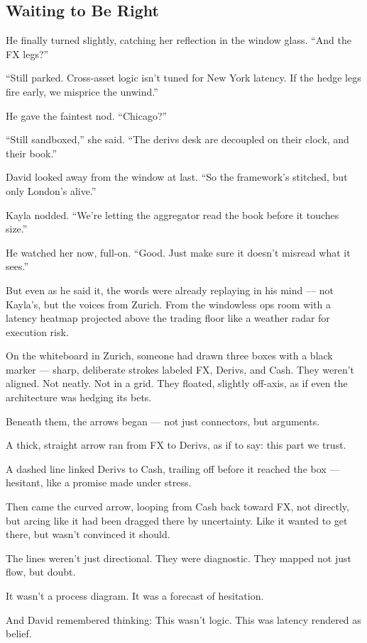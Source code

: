 
\subsection{Waiting to Be Right}

He finally turned slightly, catching her reflection in the window glass.
“And the FX legs?”

“Still parked. Cross-asset logic isn’t tuned for New York latency. If the hedge legs fire early, we misprice the unwind.”

He gave the faintest nod.
“Chicago?”

“Still sandboxed,” she said. “The derivs desk are decoupled on their clock, and their book.”

David looked away from the window at last.
“So the framework’s stitched, but only London’s alive.”

Kayla nodded.
“We’re letting the aggregator read the book before it touches size.”

He watched her now, full-on.
“Good. Just make sure it doesn’t misread what it sees.”

But even as he said it, the words were already replaying in his mind —
not Kayla’s, but the voices from Zurich.
From the windowless ops room with a latency heatmap projected above the trading floor like a weather 
radar for execution risk.

On the whiteboard in Zurich, someone had drawn three boxes with a black marker — sharp, deliberate strokes labeled FX, Derivs, 
and Cash. They weren’t aligned. Not neatly. Not in a grid.
They floated, slightly off-axis, as if even the architecture was hedging its bets.

Beneath them, the arrows began — not just connectors, but arguments.

A thick, straight arrow ran from FX to Derivs, as if to say: this part we trust.

A dashed line linked Derivs to Cash, trailing off before it reached the box — hesitant, like a promise made under stress.

Then came the curved arrow, looping from Cash back toward FX, not directly, but arcing like it had been dragged there by uncertainty. Like it wanted to get there, but wasn’t convinced it should.

The lines weren’t just directional.
They were diagnostic.
They mapped not just flow, but doubt.

It wasn’t a process diagram.
It was a forecast of hesitation.

And David remembered thinking:
This wasn’t logic. This was latency rendered as belief.

